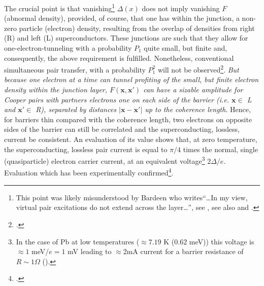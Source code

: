 The crucial point is that vanishing\footnote{This point was likely misunderstood by Bardeen who writes``\dots In my view, virtual pair excitations do not extend across the layer\dots'', see \cite{McDonald:01}, see also \cite{Bardeen:61} and \cite{Bardeen:62}.} $\Delta(x)$ does not imply vanishing $F$ (abnormal density), provided, of course, that one has within the junction, a non-zero particle (electron) density, resulting from the overlap of densities from right (R) and left (L) superconductors. These junctions are such that they allow for one-electron-tunneling with a probability $P_1$ quite small, but finite  and, consequently, the above requirement is fulfilled. Nonetheless, conventional  simultaneous pair transfer, with a probability $P_1^2$ will not be observed\footnote{\cite{Pippard:12}.}. \textit{But because one electron at a time can tunnel profiting of the small, but finite electron density within the junction layer,   $F(\mathbf{x},\mathbf{x}')$ can have a sizable amplitude for Cooper pairs with partners electrons one on each side of the barrier (i.e. $\mathbf x\in$ L and $\mathbf x'\in$ R), separated by distances $|\mathbf{x}-\mathbf{x}'|$ up to the coherence length}. Hence, for barriers  thin compared with the coherence length, two electrons on opposite sides of the barrier can still be correlated and the superconducting, lossless, current  be consistent. An evaluation of its 
value shows that, at zero temperature, the superconducting, lossless pair current is equal to $\pi/4$ times the normal, single (quasiparticle) electron carrier current, at an equivalent voltage\footnote{In the case of Pb at low temperatures ($\approx7.19$ K (0.62 meV)) this voltage is $\approx 1$ meV/$e=1$ mV leading to $\approx$2mA current for a barrier resistance of $R\sim1\Omega$ (\cite{Ambegaokar:63,McDonald:01,Tinkham:96}).} $2\Delta/e$.
Evaluation which has been experimentally confirmed\footnote{\cite{Rogalla:12}.}.

